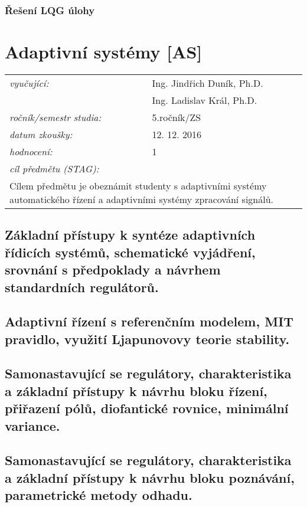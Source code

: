 \subsubsection*{Řešení LQG úlohy}
\vspace{5cm}

\newpage
\section{Adaptivní systémy [AS]}

\begin{table}[H]
\centering
\begin{tabular}{p{4cm} p{12cm}}
\textit{vyučující:}             & Ing. Jindřich Duník, Ph.D. \\
								 & Ing. Ladislav Král, Ph.D. \\
\textit{ročník/semestr studia:} & 5.ročník/ZS \\
\textit{datum zkoušky:}         & 12. 12. 2016 \\
\textit{hodnocení:}             & 1 \\
\textit{cíl předmětu (STAG):}   & \\
\multicolumn{2}{p{16cm}}{Cílem předmětu je obeznámit studenty s adaptivními systémy automatického řízení a adaptivními systémy zpracování signálů.}
\end{tabular}
\end{table}

\subsection{Základní přístupy k syntéze adaptivních řídicích systémů, schematické vyjádření, srovnání s předpoklady a návrhem standardních regulátorů.}

\newpage
\subsection{Adaptivní řízení s referenčním modelem, MIT pravidlo, využití Ljapunovovy teorie stability.}

\newpage
\subsection{Samonastavující se regulátory, charakteristika a základní přístupy k návrhu bloku řízení, přiřazení pólů, diofantické rovnice, minimální variance.}

\newpage
\subsection{Samonastavující se regulátory, charakteristika a základní přístupy k návrhu bloku poznávání, parametrické metody odhadu.}


